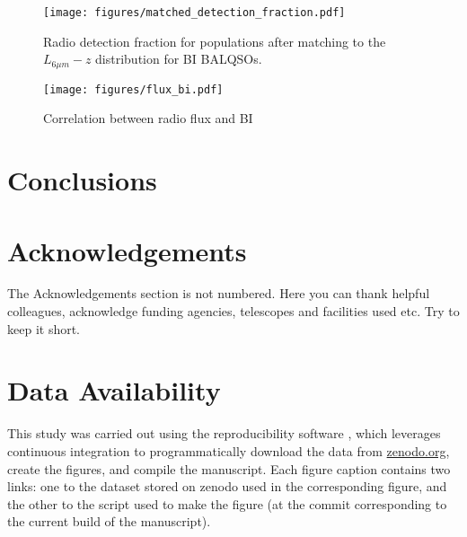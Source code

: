 \documentclass[fleqn,usenatbib]{mnras}
\begin{document}
\begin{figure}
    \centering
    \texttt{[image: figures/matched\_detection\_fraction.pdf]}
    \caption{Radio detection fraction for populations after matching to the$L_{6\mu m} - z $ distribution for BI BALQSOs. }
    \label{fig:matched_detection}
\end{figure}


\begin{figure}
    \centering
    \texttt{[image: figures/flux\_bi.pdf]}
    \caption{Correlation between radio flux and BI }
    \label{fig:flux_bi}
\end{figure}


\section{Conclusions}



\section*{Acknowledgements}

The Acknowledgements section is not numbered. Here you can thank helpful
colleagues, acknowledge funding agencies, telescopes and facilities used etc.
Try to keep it short.

\section*{Data Availability}

 
This study was carried out using the reproducibility software
\href{https://github.com/showyourwork/showyourwork}{\showyourwork}
\citep{Luger2021MappingModel}, which leverages continuous integration to
programmatically download the data from
\href{https://zenodo.org/}{zenodo.org}, create the figures, and
compile the manuscript. Each figure caption contains two links: one
to the dataset stored on zenodo used in the corresponding figure,
and the other to the script used to  make the figure (at the commit
corresponding to the current build of the manuscript).







\end{document}
